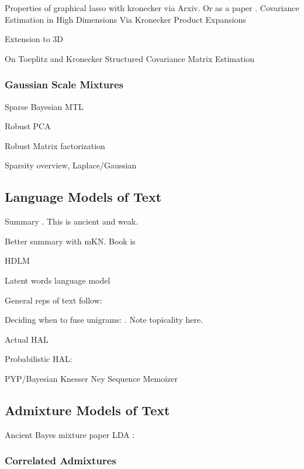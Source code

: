 \documentclass[10pt,fleqn]{article}
\begin{document}
Properties of graphical lasso with kronecker via Arxiv\cite{Tsiligkaridis2012}. Or as a paper \cite{Tsiligkaridis2012b}. 
Covariance Estimation in High Dimensions Via Kronecker Product Expansions\cite{Tsiligkaridis2013}

Extension to 3D \cite{Ohlson2011}

On Toeplitz and Kronecker Structured Covariance Matrix Estimation
\cite{Wirfalt2010}


\subsubsection{Gaussian Scale Mixtures}
Sparse Bayesian MTL \cite{Archambeau2011}

Robust PCA \cite{Archambeau2006a}

Robust Matrix factorization\cite{Balaji2011}

Sparsity overview, Laplace/Gaussian \cite{Figueiredo2003}


\subsection{Language Models of Text}

Summary \cite{Chen1996}. This is ancient and weak.

Better summary with mKN\cite{Goodman2001}. Book is \cite{Jurafsky2002}

HDLM\cite{MacKay1995}

Latent words language model \cite{Deschacht2012}

General reps of text follow:

Deciding when to fuse unigrams: \cite{Dunning1993}. Note topicality here.

Actual HAL\cite{Lund1996}

Probabilistic HAL: \cite{Azzopardi2005}

PYP/Bayesian Knesser Ney\cite{Teh2002}\cite{Teh}
Sequence Memoizer\cite{Wood2011}

\subsection{Admixture Models of Text}

Ancient Bayes mixture paper\cite{Nigam2000}
LDA : \cite{BleiNgJordan2003}\cite{Pritchard2000}

\subsubsection{Correlated Admixtures}
\end{document}
